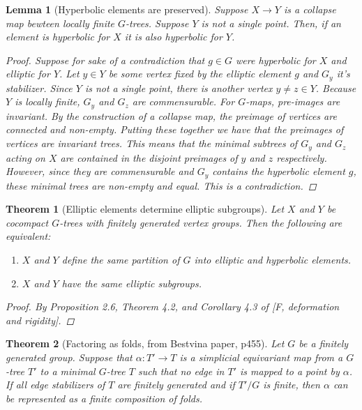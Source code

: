 \documentclass{article}
\theoremstyle{mystyle}
\newtheorem{thm}{Theorem}[section]
\newtheorem{lem}{Lemma}[section]
\theoremstyle{remark}
\begin{document}
\begin{lem}
    [Hyperbolic elements are preserved]
    \label{lem:promoteelliptic} 
    Suppose \(X \to Y\) is a collapse map bewteen locally finite \(G\)-trees. Suppose \(Y\) is not a single point. Then, if an element is hyperbolic for \(X\) it is also hyperbolic for \(Y\).
    \begin{proof}
        Suppose for sake of a contradiction that \(g\in G\) were hyperbolic for \(X\) and elliptic for \(Y\). Let \(y \in Y\) be some vertex fixed by the elliptic element \(g\) and \(G_y\) it's stabilizer. Since \(Y\) is not a single point, there is another vertex \(y\neq z \in Y\). Because \(Y\) is locally finite, \(G_y\) and \(G_z\) are commensurable. For \(G\)-maps, pre-images are invariant. By the construction of a collapse map, the preimage of vertices are connected and non-empty. Putting these together we have that the preimages of vertices are invariant trees. This means that the minimal subtrees of \(G_y\) and \(G_z\) acting on \(X\) are contained in the disjoint preimages of \(y\) and \(z\) respectively. However, since they are commensurable and \(G_y\) contains the hyperbolic element \(g\), these minimal trees are non-empty and equal. This is a contradiction.
    \end{proof}
\end{lem}

\begin{thm}
    [Elliptic elements determine elliptic subgroups]
    \label{thm:ellelesubgroups} 
    Let \(X\) and \(Y\) be cocompact \(G\)-trees with finitely generated vertex groups. Then the following are equivalent:
    \begin{enumerate}
        \item \(X\) and \(Y\) define the same partition of \(G\) into elliptic and hyperbolic elements.
        \item \(X\) and \(Y\) have the same elliptic subgroups.
    \end{enumerate}

    \begin{proof}
    By Proposition 2.6, Theorem 4.2, and Corollary 4.3 of [F, deformation and rigidity].
    \end{proof}
    
\end{thm}

\begin{thm}[Factoring as folds, from Bestvina paper, p455]
    \label{thm:folds} 
Let $G$ be a finitely generated group. Suppose that $\alpha: T'\to T$ is a simplicial equivariant map from a $G$-tree $T'$ to a minimal $G$-tree $T$ such that no edge in $T'$ is mapped to a point by $\alpha$. If all edge stabilizers of $T$ are finitely generated and if $T'/G$ is finite, then $\alpha$ can be represented as a finite composition of folds.
\end{thm}
\end{document}
